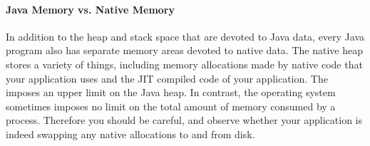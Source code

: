 \paragraph{Java Memory vs. Native Memory}
In addition to the heap and stack space that are devoted to Java data, every
Java program also has separate memory areas devoted to native data. The native
heap stores a variety of things, including memory allocations made by native
code that your application uses and the JIT compiled code of your application.
The \jre imposes an upper limit on the Java heap. In contrast, the operating
system sometimes imposes no limit on the total amount of memory consumed by a
process. Therefore you should be careful, and observe whether your application
is indeed swapping any native allocations to and from disk.

